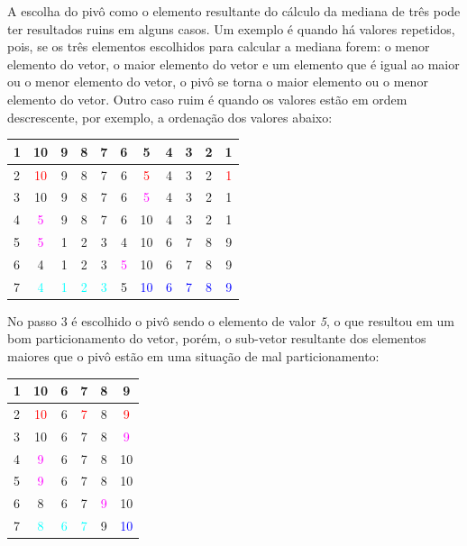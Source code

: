 \documentclass[fleqn,10pt]{SelfArx} %
\begin{document}
A escolha do pivô como o elemento resultante do cálculo da mediana de três pode ter resultados ruins em alguns casos. 
Um exemplo é quando há valores repetidos, pois, se os três elementos escolhidos para calcular a mediana forem: o menor 
elemento do vetor, o maior elemento do vetor e um elemento que é igual ao maior ou o menor elemento do vetor, o pivô se 
torna o maior elemento ou o menor elemento do vetor. Outro caso ruim é quando os valores estão em ordem descrescente, 
por exemplo, a ordenação dos valores abaixo:

\setlength\doublerulesep{0.2cm} 
\begin{center}
  \begin{tabular}{|l|cccccccccc|}
    \hline
    1 & 10 & 9 & 8 & 7 & 6 & 5 & 4 & 3 & 2 & 1  \\  \hline \hline
    2 & \textcolor{red}{10} & 9 & 8 & 7 & 6 & \textcolor{red}{5} & 4 & 3 & 2 & \textcolor{red}{1}  \\ \hline \hline
    3 & 10 & 9 & 8 & 7 & 6 & \textcolor{magenta}{5} & 4 & 3 & 2 & 1  \\ \hline \hline
    4 & \textcolor{magenta}{5} & 9 & 8 & 7 & 6 & 10 & 4 & 3 & 2 & 1  \\ \hline \hline
    5 & \textcolor{magenta}{5} & 1 & 2 & 3 & 4 & 10 & 6 & 7 & 8 & 9  \\ \hline \hline
    6 & 4 & 1 & 2 & 3 & \textcolor{magenta}{5} & 10 & 6 & 7 & 8 & 9  \\ \hline \hline
    7 & \textcolor{cyan}{4} & \textcolor{cyan}{1} & \textcolor{cyan}{2} & \textcolor{cyan}{3} & 5 & \textcolor{blue}{10} & \textcolor{blue}{6} & \textcolor{blue}{7} & \textcolor{blue}{8} & \textcolor{blue}{9}  \\
    \hline
  \end{tabular}
\end{center}

No passo 3 é escolhido o pivô sendo o elemento de valor \emph{5}, o que resultou em um bom particionamento do vetor, porém, 
o sub-vetor resultante dos elementos maiores que o pivô estão em uma situação de mal particionamento:

\setlength\doublerulesep{0.2cm} 
\begin{center}
  \begin{tabular}{|l|ccccc|}
    \hline
    1 & 10 & 6 & 7 & 8 & 9 \\  \hline \hline
    2 & \textcolor{red}{10} & 6 & \textcolor{red}{7} & 8 & \textcolor{red}{9}  \\ \hline \hline
    3 & 10 & 6 & 7 & 8 & \textcolor{magenta}{9} \\ \hline \hline
    4 & \textcolor{magenta}{9} & 6 & 7 & 8 & 10 \\ \hline \hline
    5 & \textcolor{magenta}{9} & 6 & 7 & 8 & 10 \\ \hline \hline
    6 & 8 & 6 & 7 & \textcolor{magenta}{9} & 10 \\ \hline \hline
    7 & \textcolor{cyan}{8} & \textcolor{cyan}{6} & \textcolor{cyan}{7} & 9 & \textcolor{blue}{10} \\
    \hline
  \end{tabular}
\end{center}
\end{document}
